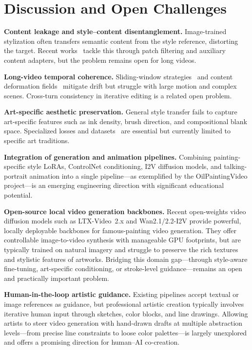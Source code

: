 \section{Discussion and Open Challenges}
\label{sec:discussion}

\textbf{Content leakage and style--content disentanglement.} Image-trained stylization
often transfers semantic content from the style reference, distorting the target.
Recent works~\cite{ye2025stylemaster,chen2024artadapter} tackle this through patch
filtering and auxiliary content adapters, but the problem remains open for long videos.

\textbf{Long-video temporal coherence.} Sliding-window strategies~\cite{li2026echostyle}
and content deformation fields~\cite{ouyang2024codef} mitigate drift but struggle with
large motion and complex scenes. Cross-turn consistency in iterative editing is a
related open problem.

\textbf{Art-specific aesthetic preservation.} General style transfer fails to capture
art-specific features such as ink density, brush direction, and compositional blank
space. Specialized losses and datasets~\cite{he2023bitgan,liu2026chipdiff,zhang2025inkspirit}
are essential but currently limited to specific art traditions.

\textbf{Integration of generation and animation pipelines.} Combining painting-specific
style LoRAs, ControlNet conditioning, I2V diffusion models, and talking-portrait
animation into a single pipeline---as exemplified by the OilPaintingVideo project---is
an emerging engineering direction with significant educational potential.

\textbf{Open-source local video generation backbones.} Recent open-weights video
diffusion models such as LTX-Video~2.x and Wan2.1/2.2-I2V provide powerful, locally
deployable backbones for famous-painting video generation. They offer controllable
image-to-video synthesis with manageable GPU footprints, but are typically trained on
natural imagery and struggle to preserve the rich textures and stylistic features of
artworks. Bridging this domain gap---through style-aware fine-tuning, art-specific
conditioning, or stroke-level guidance---remains an open and practically important
problem.

\textbf{Human-in-the-loop artistic guidance.} Existing pipelines accept textual or
image references as guidance, but professional artistic creation typically involves
iterative human input through sketches, color blocks, and line drawings. Allowing
artists to steer video generation with hand-drawn drafts at multiple abstraction
levels---from precise line constraints to loose color palettes---is largely unexplored
and offers a promising direction for human--AI co-creation.

